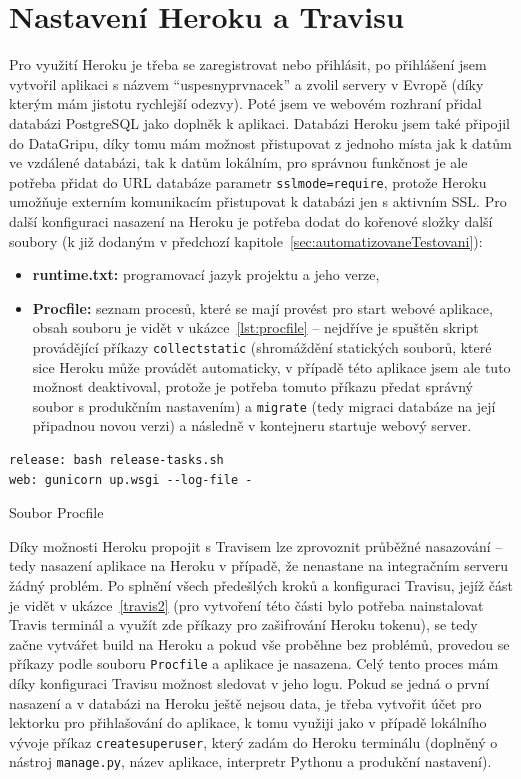     \section{Nastavení Heroku a Travisu}
    Pro využití Heroku je třeba se zaregistrovat nebo přihlásit, po přihlášení jsem vytvořil aplikaci s názvem \enquote{uspesnyprvnacek} a zvolil servery v Evropě (díky kterým mám jistotu rychlejší odezvy). Poté jsem ve webovém rozhraní přidal databázi PostgreSQL jako doplněk k aplikaci. Databázi Heroku jsem také připojil do DataGripu, díky tomu mám možnost přistupovat z jednoho místa jak k datům ve vzdálené databázi, tak k datům lokálním, pro správnou funkčnost je ale potřeba přidat do URL databáze parametr \verb|sslmode=require|, protože Heroku umožňuje externím komunikacím přistupovat k databázi jen s aktivním SSL. Pro další konfiguraci nasazení na Heroku je potřeba dodat do kořenové složky další soubory (k již dodaným v předchozí kapitole~\ref{sec:automatizovaneTestovani}):
    \begin{itemize}
        \item \textbf{runtime.txt:} programovací jazyk projektu a jeho verze,
        \item \textbf{Procfile:} seznam procesů, které se mají provést pro start webové aplikace, obsah souboru je vidět v ukázce~\ref{lst:procfile} -- nejdříve je spuštěn skript provádějící příkazy \verb|collectstatic| (shromáždění statických souborů, které sice Heroku může provádět automaticky, v případě této aplikace jsem ale tuto možnost deaktivoval, protože je potřeba tomuto příkazu předat správný soubor s produkčním nastavením) a \verb|migrate| (tedy migraci databáze na její připadnou novou verzi) a následně v kontejneru startuje webový server.
    \end{itemize}
    
    \begin{listing}[ht]
    	\begin{verbatim}
release: bash release-tasks.sh
web: gunicorn up.wsgi --log-file -
    	\end{verbatim}
    	\caption{Soubor Procfile}\label{lst:procfile}
    \end{listing}
    
    Díky možnosti Heroku propojit s Travisem \cite{travis-heroku} lze zprovoznit průběžné nasazování -- tedy nasazení aplikace na Heroku v případě, že nenastane na integračním serveru žádný problém. Po splnění všech předešlých kroků a konfiguraci Travisu, jejíž část je vidět v ukázce~\ref{travis2} (pro vytvoření této části bylo potřeba nainstalovat Travis terminál a využít zde příkazy pro zašifrování Heroku tokenu), se tedy začne vytvářet build na Heroku a pokud vše proběhne bez problémů, provedou se příkazy podle souboru \verb|Procfile| a aplikace je nasazena. Celý tento proces mám díky konfiguraci Travisu možnost sledovat v jeho logu. Pokud se jedná o první nasazení a v databázi na Heroku ještě nejsou data, je třeba vytvořit účet pro lektorku pro přihlašování do aplikace, k tomu využiji jako v případě lokálního vývoje příkaz \verb|createsuperuser|, který zadám do Heroku terminálu (doplněný o nástroj \verb|manage.py|, název aplikace, interpretr Pythonu a produkční nastavení).
    

